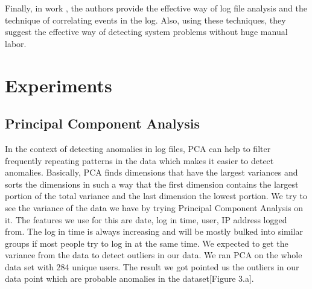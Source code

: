 \documentclass [11pt]{article}
\begin{document}
Finally, in work \cite{lou2010mining,rouillard2004real}, the authors provide the effective way of log file analysis and the technique of correlating events in the log. Also, using these techniques, they suggest the effective way of detecting system problems without huge manual labor.


\section{Experiments}
\subsection{Principal Component Analysis}

In the context of detecting anomalies in log files, PCA can help to filter frequently repeating patterns in the data which makes it easier to detect anomalies. Basically, PCA finds dimensions that have the largest variances and sorts the dimensions in such a way that the first dimension contains the largest portion of the total variance and the last dimension the lowest portion. We try to see the variance of the data we have by trying Principal Component Analysis on it. The features we use for this are date, log in time, user, IP address logged from. The log in time is always increasing and will be mostly bulked into similar groups if most people try to log in at the same time. We expected to get the variance from the data to detect outliers\cite{PCA} in our data. We ran PCA on the whole data set with 284 unique users. The result we got pointed us the outliers in our data point which are probable anomalies in the dataset[Figure 3.a].
\end{document}
